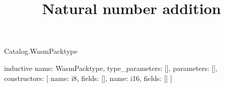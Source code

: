 \begin{lexlean}{Catalog.WasmPacktype}
\title{Natural number addition}
\begin{semanticmodule}
inductive{
  name: WasmPacktype,
  type_parameters: [],
  parameters: [],
  constructors: [
    {name: i8, fields: []},
    {name: i16, fields: []}
  ]
}
\end{semanticmodule}
\end{lexlean}
